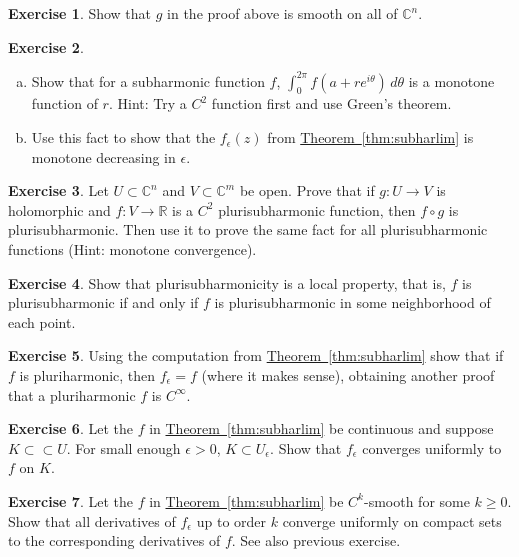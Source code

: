\documentclass[12pt,openany]{book}
\newcommand{\C}{{\mathbb{C}}}
\newcommand{\R}{{\mathbb{R}}}
\theoremstyle{plain}
\theoremstyle{remark}
\theoremstyle{definition}
\newenvironment{exbox}{%
    \def\FrameCommand{\vrule width 1pt \relax\hspace{10pt}}%
    \MakeFramed{\advance\hsize-\width\FrameRestore}%
}{%
    \endMakeFramed
}
\newenvironment{exparts}{%
    \leavevmode\begin{enumerate}[a),noitemsep,topsep=0pt,parsep=0pt,partopsep=0pt]
}{%
    \end{enumerate}
}
\theoremstyle{exercise}
\newtheorem{exercise}{Exercise}[section]
\theoremstyle{example}
\newcommand{\thmref}[1]{\hyperref[#1]{Theorem~\ref*{#1}}}
\begin{document}
\begin{exbox}
\begin{exercise}
Show that $g$ in the proof above is smooth on all of $\C^n$.
\end{exercise}

\begin{exercise}
\begin{exparts}
\item
Show that for a subharmonic function $f$, $\int_0^{2\pi} f(a+re^{i\theta}) \,
d\theta$ is a monotone function of $r$.
Hint: Try a $C^2$ function first and use Green's theorem.
\item
Use this
fact to show that the $f_\epsilon(z)$ from \thmref{thm:subharlim} is monotone
decreasing in $\epsilon$.
\end{exparts}
\end{exercise}

\begin{exercise}
Let $U \subset \C^n$
and $V \subset \C^m$ be open.
Prove that
if $g \colon U \to V$ is holomorphic and $f
\colon V \to \R$ is a $C^2$ plurisubharmonic function, then
$f \circ g$ is plurisubharmonic.
Then use it to prove the same fact
for all plurisubharmonic functions (Hint: monotone convergence).
\end{exercise}

\begin{exercise}
Show that plurisubharmonicity is a local property, that is,
$f$ is plurisubharmonic if and only if $f$ is plurisubharmonic in
some neighborhood of each point.
\end{exercise}

\begin{exercise}
Using the computation from
\thmref{thm:subharlim} show that if $f$ is pluriharmonic, then
$f_\epsilon = f$ (where it makes sense), obtaining another proof that
a pluriharmonic $f$ is $C^\infty$.
\end{exercise}

\begin{exercise}
Let the $f$ in \thmref{thm:subharlim} be continuous and suppose $K \subset
\subset U$.  For small enough $\epsilon >0$, $K \subset U_\epsilon$.
Show that $f_\epsilon$ converges uniformly to $f$ on $K$.
\end{exercise}

\begin{exercise}
Let the $f$ in \thmref{thm:subharlim} be $C^k$-smooth for some $k \geq 0$.
Show that all derivatives of $f_\epsilon$ up to order $k$ converge uniformly
on compact sets to the corresponding derivatives of $f$.  See also previous
exercise.
\end{exercise}
\end{exbox}
\end{document}
